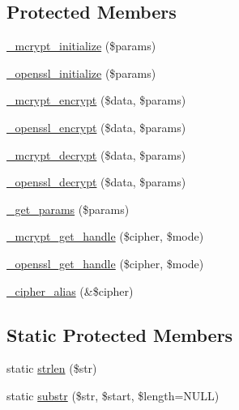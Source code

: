 \subsection*{Protected Members}
\begin{DoxyCompactItemize}
\item 
\mbox{\hyperlink{class_c_i___encryption_abf302acf347b00301e055943940a0c08}{\+\_\+mcrypt\+\_\+initialize}} (\$params)
\item 
\mbox{\hyperlink{class_c_i___encryption_ac867f7f42841784f234ce934318340f7}{\+\_\+openssl\+\_\+initialize}} (\$params)
\item 
\mbox{\hyperlink{class_c_i___encryption_a9bd463b7c807315f4518e9caff68939a}{\+\_\+mcrypt\+\_\+encrypt}} (\$data, \$params)
\item 
\mbox{\hyperlink{class_c_i___encryption_ad013a80183158b98c314d5d8641933c4}{\+\_\+openssl\+\_\+encrypt}} (\$data, \$params)
\item 
\mbox{\hyperlink{class_c_i___encryption_a7d3a3c3cc3609b5af60bfa953892a058}{\+\_\+mcrypt\+\_\+decrypt}} (\$data, \$params)
\item 
\mbox{\hyperlink{class_c_i___encryption_a37f8642a2440f6f7d507d5a7a563de59}{\+\_\+openssl\+\_\+decrypt}} (\$data, \$params)
\item 
\mbox{\hyperlink{class_c_i___encryption_ab5bb04b4151b23afd9dccad358b3967b}{\+\_\+get\+\_\+params}} (\$params)
\item 
\mbox{\hyperlink{class_c_i___encryption_a93399ba15094e793aede8da7dc1f06aa}{\+\_\+mcrypt\+\_\+get\+\_\+handle}} (\$cipher, \$mode)
\item 
\mbox{\hyperlink{class_c_i___encryption_aa6db6b226eb918ae0630158730c1fcdb}{\+\_\+openssl\+\_\+get\+\_\+handle}} (\$cipher, \$mode)
\item 
\mbox{\hyperlink{class_c_i___encryption_a2b585f447a6282e702dd3153baf3d68f}{\+\_\+cipher\+\_\+alias}} (\&\$cipher)
\end{DoxyCompactItemize}
\subsection*{Static Protected Members}
\begin{DoxyCompactItemize}
\item 
static \mbox{\hyperlink{class_c_i___encryption_a4c29a687d4ed62c26a10e41d98930d5f}{strlen}} (\$str)
\item 
static \mbox{\hyperlink{class_c_i___encryption_a101caef57ef0b165da5747e2c2e6c9dc}{substr}} (\$str, \$start, \$length=N\+U\+LL)
\end{DoxyCompactItemize}
